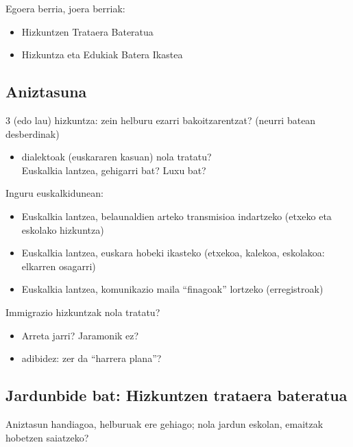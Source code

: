 \documentclass[
]{book}
\providecommand{\tightlist}{%
  \setlength{\itemsep}{0pt}\setlength{\parskip}{0pt}}
\begin{document}
Egoera berria, joera berriak:

\begin{itemize}
\tightlist
\item
  Hizkuntzen Trataera Bateratua
\item
  Hizkuntza eta Edukiak Batera Ikastea
\end{itemize}

\hypertarget{aniztasuna}{%
\subsection{Aniztasuna}\label{aniztasuna}}

3 (edo lau) hizkuntza: zein helburu ezarri bakoitzarentzat? (neurri batean desberdinak)

\begin{itemize}
\tightlist
\item
  dialektoak (euskararen kasuan) nola tratatu?\\
  Euskalkia lantzea, gehigarri bat? Luxu bat?
\end{itemize}

Inguru euskalkidunean:

\begin{itemize}
\tightlist
\item
  Euskalkia lantzea, belaunaldien arteko transmisioa indartzeko (etxeko eta eskolako hizkuntza)
\item
  Euskalkia lantzea, euskara hobeki ikasteko (etxekoa, kalekoa, eskolakoa: elkarren osagarri)
\item
  Euskalkia lantzea, komunikazio maila ``finagoak'' lortzeko (erregistroak)
\end{itemize}

Immigrazio hizkuntzak nola tratatu?

\begin{itemize}
\tightlist
\item
  Arreta jarri? Jaramonik ez?
\item
  adibidez: zer da ``harrera plana''?
\end{itemize}

\hypertarget{jardunbide-bat-hizkuntzen-trataera-bateratua}{%
\subsection{Jardunbide bat: Hizkuntzen trataera bateratua}\label{jardunbide-bat-hizkuntzen-trataera-bateratua}}

Aniztasun handiagoa, helburuak ere gehiago; nola jardun eskolan, emaitzak hobetzen saiatzeko?
\end{document}
